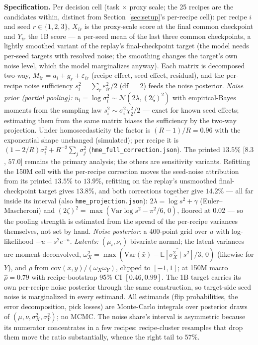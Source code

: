 \textbf{Specification.} Per decision cell (task $\times$ proxy scale; the 25 recipes are
the candidates within, distinct from Section~\ref{sec:setup}'s per-recipe cell): per recipe $i$ and seed
$r \in \{1,2,3\}$, $X_{ir}$ is the proxy-scale score at the final common checkpoint and
$Y_{ir}$ the 1B score --- a per-seed mean of the last three common checkpoints, a lightly
smoothed variant of the replay's final-checkpoint target (the model needs per-seed targets
with resolved noise; the smoothing changes the target's own noise level, which the model
marginalizes anyway). Each matrix is
decomposed two-way, $M_{ir} = a_i + g_r + \varepsilon_{ir}$ (recipe effect, seed effect,
residual), and the per-recipe noise sufficiency $s_i^2 = \sum_r \varepsilon_{ir}^2 / 2$
(df $=2$) feeds the noise posterior. \emph{Noise prior (partial pooling):} $u_i = \log
\sigma_i^2 \sim \mathcal{N}(2\lambda, (2\zeta)^2)$ with empirical-Bayes moments from the
sampling law $s_i^2 \sim \sigma_i^2 \chi^2_2/2$ --- exact for known seed effects; estimating
them from the same matrix biases the sufficiency by the two-way projection. Under
homoscedasticity the factor is $(R{-}1)/R = 0.96$ with the exponential shape unchanged
(simulated); per recipe it is $(1{-}2/R)\sigma_i^2 + R^{-2}\sum_j \sigma_j^2$
(\texttt{hme\_full\_correction.json}). The printed $13.5\%$ [$8.3$, $57.0$] remains the primary analysis; the others are sensitivity variants. Refitting the 150M cell with the per-recipe correction moves the seed-noise attribution from its printed $13.5\%$ to $13.9\%$, refitting on the replay's unsmoothed final-checkpoint target gives $13.8\%$, and both corrections together give $14.2\%$ --- all far inside its interval (also \texttt{hme\_projection.json}): $2\lambda = \overline{\log s^2} + \gamma$
(Euler--Mascheroni) and $(2\zeta)^2 = \max(\mathrm{Var}\log s^2 - \pi^2/6, \,0)$, floored at
$0.02$ --- so the pooling strength is estimated from the spread of the per-recipe variances
themselves, not set by hand. \emph{Noise posterior:} a 400-point grid over $u$ with
log-likelihood $-u - s^2 e^{-u}$. \emph{Latents:} $(\mu_i, \nu_i)$ bivariate normal; the latent
variances are moment-deconvolved, $\omega_X^2 = \max(\mathrm{Var}(\bar x) -
\overline{\mathbb{E}[\sigma_X^2 \mid s^2]}/3, \,0)$ (likewise for $Y$), and $\rho$ from
$\mathrm{cov}(\bar x, \bar y)/(\omega_X \omega_Y)$, clipped to $[-1, 1]$; at 150M macro
$\hat\rho = 0.79$ with recipe-bootstrap 95\% CI $[0.46, 0.99]$. The 1B target carries its own
per-recipe noise posterior through the same construction, so target-side seed noise is
marginalized in every estimand. All estimands (flip probabilities, the error decomposition,
pick losses) are Monte-Carlo integrals over posterior draws of $(\mu, \nu, \sigma_X^2,
\sigma_Y^2)$; no MCMC. The noise share's interval is asymmetric because its numerator
concentrates in a few recipes: recipe-cluster resamples that drop them move the ratio
substantially, whence the right tail to $57\%$.

